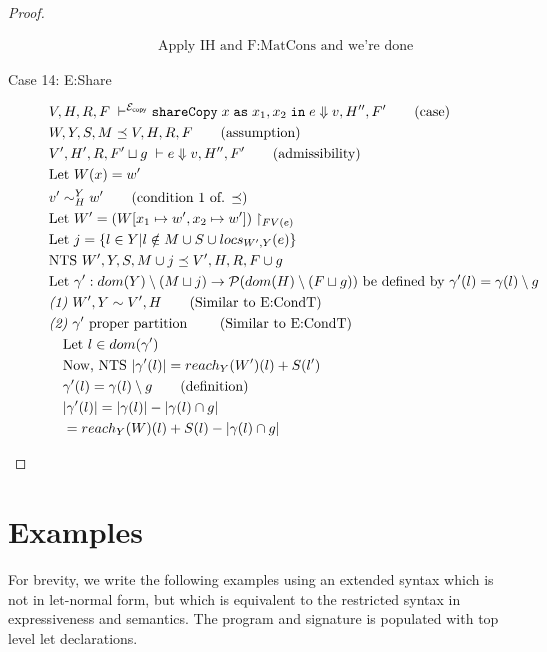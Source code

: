 \documentclass[11pt]{article}
\newcommand{\ms}[1]{\ensuremath{\mathsf{#1}}}
\newcommand{\irl}[1]{\mathtt{#1}}
\newcounter{rule}
\newcommand{\sharecpcst}[4]{\irl{shareCopy}\;#1\;\irl{as}\;#2,#3\;\irl{in}\;#4}
\newcommand{\veq}[4]{#3 \sim^{#1}_{#2} #4}
\newcommand{\copySem}{\ensuremath{\mathcal{E}_{\ms{copy}}}}
\theoremstyle{definition}
\begin{document}
\begin{proof}
\begin{description}
\begin{align*}
		&\text{Apply IH and F:MatCons and we're done}
  \end{align*}
  \item[Case 14: E:Share]
	\begin{align*}
		&V,H,R,F \; \vdash^{\copySem} \sharecpcst{x}{x_1}{x_2}{e} \Downarrow v,H'',F' \tag{case}\\
		&W,Y,S,M \preceq V,H,R,F \tag{assumption}\\
		&V',H',R,F' \sqcup g \; \vdash e \Downarrow v,H'',F' \tag{admissibility}\\
		&\text{Let } W(x) = w'\\
		&\veq{Y}{H}{v'}{w'} \tag{condition 1 of. $\preceq$}\\
		&\text{Let } W' = (W[x_1 \mapsto w', x_2 \mapsto w'])\restriction_{FV(e)}\\
		&\text{Let } j = \{l \in Y | l \notin M \cup S \cup locs_{W',Y}(e) \}\\
		&\text{NTS } W',Y,S,M \cup j \preceq V',H,R,F \cup g\\
		&\text{Let } \gamma' : dom(Y) \setminus (M \sqcup j) 
		\to \mathcal{P}(dom(H) \setminus (F \sqcup g)) \text{ be defined by } 
		\gamma'(l) = \gamma(l) \setminus g\\
		&\emph{(1) } W',Y \sim V',H \tag{Similar to E:CondT}\\
		&\emph{(2) } \gamma' \text{ proper partition } \tag{Similar to E:CondT}\\
		&\quad \text{Let } l \in dom(\gamma')\\
		&\quad \text{Now, NTS } |\gamma'(l)| = reach_{Y}(W')(l) + S(l')\\
		&\quad \gamma'(l) = \gamma(l) \setminus g \tag{definition}\\ 
		&\quad |\gamma'(l)| = |\gamma(l)| - |\gamma(l) \cap g|\\
		&\quad = reach_Y(W)(l) + S(l) - |\gamma(l) \cap g|\\
	\end{align*}
  \end{description}
\end{proof}

\label{sect:bib}

%
%
%



\section{Examples}

For brevity, we write the following examples using an extended syntax which is not in let-normal form, but
which is equivalent to the restricted syntax in expressiveness and semantics. The 
program and signature is populated with top level let declarations.\\
\end{document}
